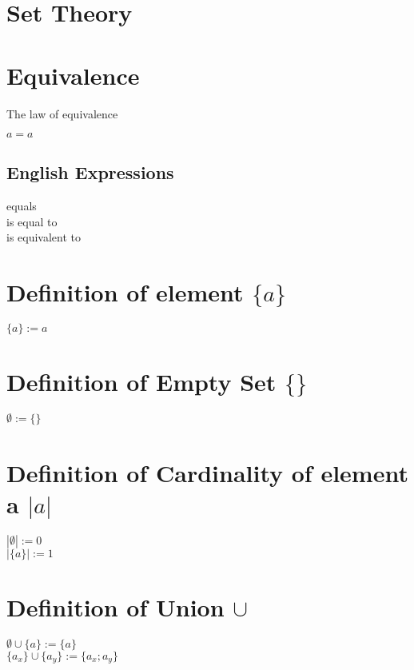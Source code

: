 \documentclass[11pt]{article}
\begin{document}
\section*{Set Theory}



\section{Equivalence}
The law of equivalence
\begin{center}
$
a = a
$
\end{center}
\subsection{English Expressions}
equals\\
is equal to\\
is equivalent to\\




\section{Definition of element $\{a\}$}
\begin{center}
$
\{a\} := a
$
\\ \vspace{2mm}
\end{center}




\section{Definition of Empty Set $\{\}$}
\begin{center}
$
\emptyset := \{\}
$
\end{center}





\section{Definition of Cardinality of element a $|a|$}
\begin{center}
$
|\emptyset| := 0
$
\\ \vspace{2mm}
$
|\{a\}| := 1
$
\end{center}





\section{Definition of Union $\cup$}
\begin{center}
$
\emptyset \cup \{a\} := \{a\}
$
\\ \vspace{2mm}
$
\{a_x\}\cup \{a_y\} := \{a_x; a_y\}
$
\end{center}
\end{document}
